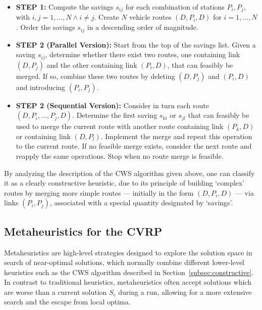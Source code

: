 \begin{itemize}

    \item \textbf{STEP 1:} Compute the savings $s_{ij}$ for each combination of 
            stations $P_i, P_j$, with $i,j = 1, ..., N \wedge i \neq j$. Create $N$ vehicle 
            routes $(D,P_i,D)$ for $i = 1, ..., N$. Order the savings $s_{ij}$ in 
            a descending order of magnitude.
    \item \textbf{STEP 2 (Parallel Version):} Start from the top of the 
            savings list. Given a saving $s_{ij}$, determine whether there 
            exist two routes, one containing link $(D,P_j)$ and the other 
            containing link $(P_i, D)$, that can feasibly be merged. If so, 
            combine these two routes by deleting $(D,P_j)$ and $(P_i,D)$ and 
            introducing $(P_i,P_j)$.
    \item \textbf{STEP 2 (Sequential Version):} Consider in turn each route 
            $(D,P_i,...,P_j,D)$. Determine the first saving $s_{ki}$ or $s_{jl}$ 
            that can 
            feasibly be used to merge the current route with another route 
            containing link $(P_k, D)$ or containing link $(D, P_l)$. 
            Implement the merge and repeat this operation to the current route. 
            If no feasible merge exists, consider the next route and reapply 
            the same operations. Stop when no route merge is feasible.
\end{itemize}\vertbreak

By analyzing the description of the CWS algorithm given above, one can classify 
it as a clearly constructive heuristic, due to its principle of building 
`complex' routes by merging more simple routes --- initially in the form 
$(D,P_i,D)$ --- via links $(P_i,P_j)$, associated with a special quantity designated 
by `savings'.

\subsection{Metaheuristics for the CVRP}
\label{subsec:metaheuristics}

Metaheuristics are high-level strategies designed to explore the solution space 
in search of near-optimal solutions, which normally combine different 
lower-level heuristics such as the CWS algorithm described in 
Section~\ref{subsec:constructive}. In contrast to traditional heuristics, 
metaheuristics often accept solutions which are worse than a current solution 
$S_c$ during a run, allowing for a more extensive search and the escape from 
local optima.\vertbreak

